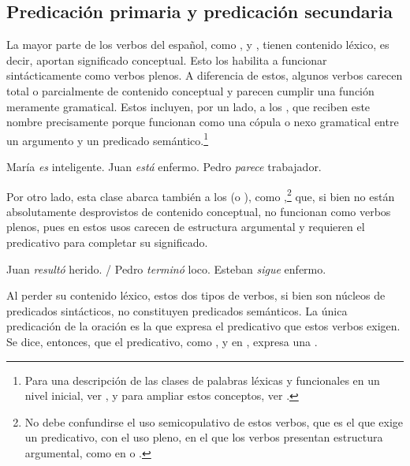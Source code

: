 \subsection{Predicación primaria y predicación secundaria}\label{sec:09-primaria}

La mayor parte de los verbos del español, como ,  y
, tienen contenido léxico, es decir, aportan significado conceptual.
Esto los habilita a funcionar sintácticamente como verbos plenos. A diferencia
de estos, algunos verbos carecen total o parcialmente de contenido conceptual y
parecen cumplir una función meramente gramatical. Estos incluyen, por un lado, a
los  , que reciben este
nombre precisamente porque funcionan como una cópula o nexo gramatical entre un
argumento y un predicado semántico.\footnote{Para una descripción de las clases
de palabras léxicas y funcionales en un nivel inicial, ver
\textcite{giammatteo2009}, y para ampliar estos conceptos, ver
\textcite{bosque1990}.}

\begin{exe}
  \ex\label{ex:09-copulativos}
    \begin{xlist}
      \ex María \textit{es} inteligente.
      \ex Juan \textit{está} enfermo.
      \ex Pedro \textit{parece} trabajador.
    \end{xlist}
\end{exe}

Por otro lado, esta clase abarca también a los 
(o ), como ,\footnote{No debe confundirse el uso semicopulativo de estos verbos, que
es el que exige un predicativo, con el uso pleno, en el que los verbos presentan
estructura argumental, como en  o .} que, si bien no están absolutamente desprovistos de contenido
conceptual, no funcionan como verbos plenos, pues en estos usos carecen de
estructura argumental y requieren el predicativo para completar su significado.

\begin{exe}
  \ex
    \begin{xlist}
      \ex Juan \textit{resultó} herido. / 
      \ex Pedro \textit{terminó} loco.
      \ex Esteban \textit{sigue} enfermo.
    \end{xlist}
\end{exe}

Al perder su contenido léxico, estos dos tipos de verbos, si bien son núcleos de
predicados sintácticos, no constituyen predicados semánticos. La única
predicación de la oración es la que expresa el predicativo que estos verbos
exigen. Se dice, entonces, que el predicativo, como ,
 y  en , expresa una
.

